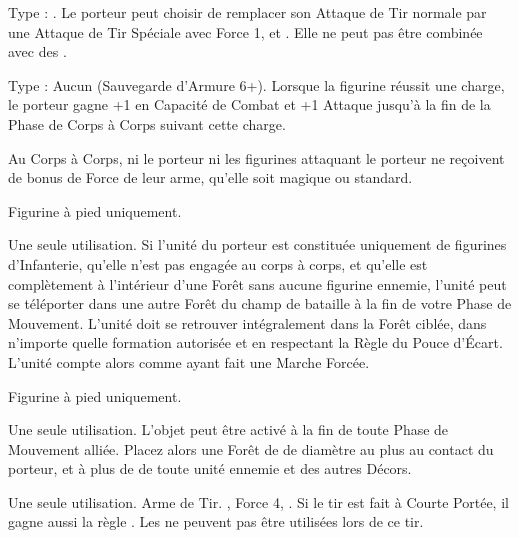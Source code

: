 Type : \longbow{}. Le porteur peut choisir de remplacer son Attaque de Tir normale par une Attaque de Tir Spéciale avec Force 1, \poisonedattacks{} et . Elle ne peut pas être combinée avec des \feyarrows{}.

\endpricelist

\armymagicalarmour

\startpricelist

Type : Aucun (Sauvegarde d'Armure 6+). Lorsque la figurine réussit une charge, le porteur gagne +1 en Capacité de Combat et +1 Attaque jusqu'à la fin de la Phase de Corps à Corps suivant cette charge.

\endpricelist

\armytalismans

\startpricelist

Au Corps à Corps, ni le porteur ni les figurines attaquant le porteur ne reçoivent de bonus de Force de leur arme, qu'elle soit magique ou standard.

\endpricelist

\armyenchanteditems

\startpricelist

Figurine à pied uniquement.

Une seule utilisation. Si l'unité du porteur est constituée uniquement de figurines d'Infanterie, qu'elle n'est pas engagée au corps à corps, et qu'elle est complètement à l'intérieur d'une Forêt sans aucune figurine ennemie, l'unité peut se téléporter dans une autre Forêt du champ de bataille à la fin de votre Phase de Mouvement. L'unité doit se retrouver intégralement dans la Forêt ciblée, dans n'importe quelle formation autorisée et en respectant la Règle du Pouce d'Écart. L'unité compte alors comme ayant fait une Marche Forcée.

Figurine à pied uniquement.

Une seule utilisation. L'objet peut être activé à la fin de toute Phase de Mouvement alliée. Placez alors une Forêt de  de diamètre au plus au contact du porteur, et à plus de  de toute unité ennemie et des autres Décors.

Une seule utilisation. Arme de Tir. , Force 4, . Si le tir est fait à Courte Portée, il gagne aussi la règle . Les \feyarrows{} ne peuvent pas être utilisées lors de ce tir.

